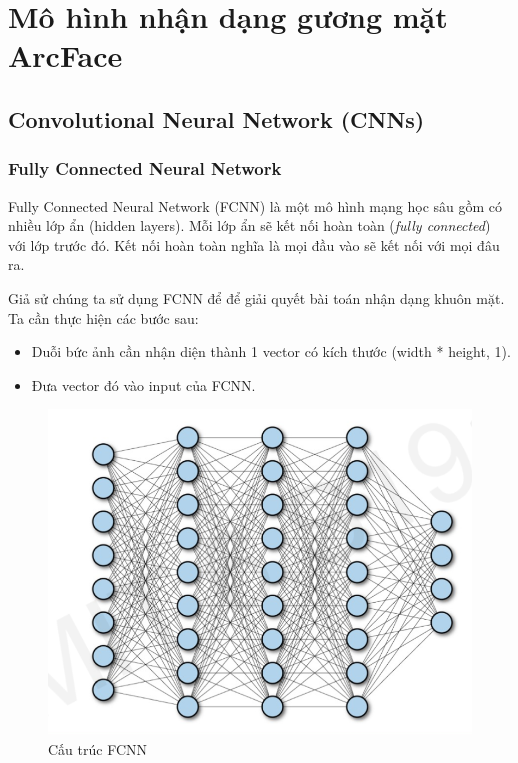 \documentclass[a4paper, 12pt]{article}
\begin{document}
\section{Mô hình nhận dạng gương mặt ArcFace}
\subsection{Convolutional Neural Network (CNNs)}
\subsubsection{Fully Connected Neural Network}
Fully Connected Neural Network (FCNN) là một mô hình mạng học sâu gồm có nhiều lớp ẩn (hidden layers). Mỗi lớp ẩn sẽ kết nối hoàn toàn (\textit{fully connected}) với lớp trước đó. Kết nối hoàn toàn nghĩa là mọi đầu vào sẽ kết nối với mọi đâu ra. 

Giả sử chúng ta sử dụng FCNN để  để giải quyết bài toán nhận dạng khuôn mặt. Ta cần thực hiện các bước sau: 
\begin{itemize}
    \item Duỗi bức ảnh cần nhận diện thành 1 vector có kích thước (width * height, 1).
    \item Đưa vector đó vào input của FCNN.
\end{itemize}

    \begin{figure}[H]
        \begin{center}
            \includegraphics[scale=0.5]{img/Fully-Connected-Neural-Network.png}
            \caption{Cấu trúc FCNN}
        \end{center}
    \end{figure}
\end{document}
